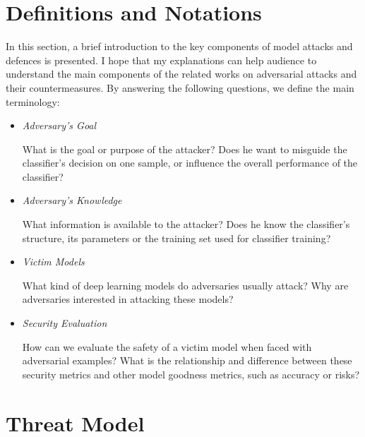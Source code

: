 \section{Definitions and Notations}
    In this section, a brief introduction to the key components of model attacks and defences is presented. I  hope that my explanations can help audience to understand the main components of the related works on adversarial attacks and their countermeasures. By answering the following questions, we define the main terminology:

    \begin{itemize}
        \item \textit{Adversary's Goal} 

        What is the goal or purpose of the attacker? Does he want to misguide the classifier's decision on one sample, or influence the overall performance of the classifier?
        \item \textit{Adversary's Knowledge}

        What information is available to the attacker? Does he know the classifier's structure, its parameters or the training set used for classifier training?
        \item \textit{Victim Models}

        What kind of deep learning models do adversaries usually attack? Why are adversaries interested in attacking these models?
        \item \textit{Security Evaluation}

        How can we evaluate the safety of a victim model when faced with adversarial examples? What is the relationship and difference between these security metrics and other model goodness metrics, such as accuracy or risks?
    \end{itemize}

	\section{Threat Model}
